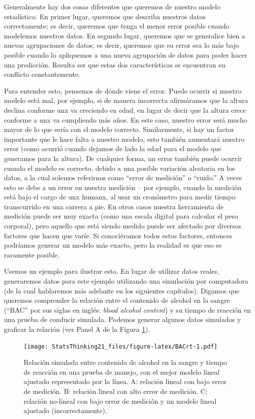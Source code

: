 \documentclass[
  12pt,
]{book}
\begin{document}
Generalmente hay dos cosas diferentes que queremos de nuestro modelo estadístico. En primer lugar, queremos que describa nuestros datos correctamente; es decir, queremos que tenga el menor error posible cuando modelemos nuestros datos. En segundo lugar, queremos que se generalice bien a nuevas agrupaciones de datos; es decir, queremos que su error sea lo más bajo posible cuando lo apliquemos a una nueva agrupación de datos para poder hacer una predicción. Resulta ser que estas dos características se encuentran en conflicto constantemente.

Para entender esto, pensemos de dónde viene el error. Puede ocurrir si nuestro modelo está mal, por ejemplo, si de manera incorrecta afirmáramos que la altura declina conforme unx va creciendo en edad, en lugar de decir que la altura crece conforme a unx va cumpliendo más años. En este caso, nuestro error será mucho mayor de lo que sería con el modelo correcto. Similarmente, si hay un factor importante que le hace falta a nuestro modelo, esto también aumentará nuestro error (como ocurrió cuando dejamos de lado la edad para el modelo que generamos para la altura). De cualquier forma, un error también puede ocurrir cuando el modelo es correcto, debido a una posible variación aleatoria en los datos, a la cual solemos referirnos como ``error de medición'' o ``ruido.'' A veces esto se debe a un error en nuestra medición -- por ejemplo, cuando la medición está bajo el cargo de unx humanx, al usar un cronómetro para medir tiempo transcurrido en una carrera a pie. En otros casos nuestra herramienta de medición puede ser muy exacta (como una escala digital para calcular el peso corporal), pero aquello que está siendo medido puede ser afectado por diversos factores que hacen que varíe. Si conociéramos todos estos factores, entonces podríamos generar un modelo más exacto, pero la realidad es que eso es raramente posible.

Usemos un ejemplo para ilustrar esto. En lugar de utilizar datos reales, generaremos datos para este ejemplo utilizando una simulación por computadora (de la cual hablaremos más adelante en los siguientes capítulos). Digamos que queremos comprender la relación entre el contenido de alcohol en la sangre (``BAC'' por sus siglas en inglés: \emph{blood alcohol content}) y su tiempo de reacción en una prueba de conducir simulada. Podemos generar algunos datos simulados y graficar la relación (ver Panel A de la Figura \ref{fig:BACrt}).

\begin{figure}
\centering
\texttt{[image: StatsThinking21\_files/figure-latex/BACrt-1.pdf]}
\caption{\label{fig:BACrt}Relación simulada entre contenido de alcohol en la sangre y tiempo de reacción en una prueba de manejo, con el mejor modelo lineal ajustado representado por la línea. A: relación lineal con bajo error de medición. B: relación lineal con alto error de medición. C: relación no-lineal con bajo error de medición y un modelo lineal ajustado (incorrectamente).}
\end{figure}
\end{document}
